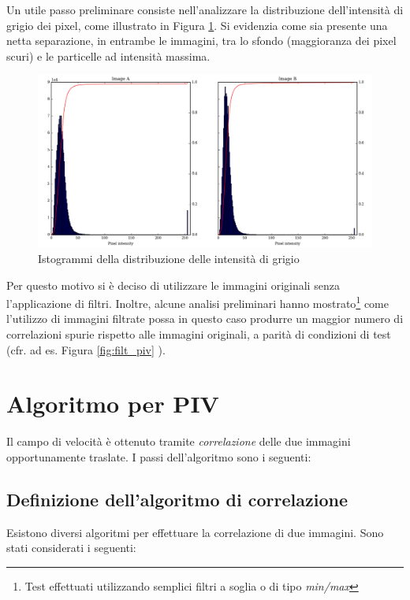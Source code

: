\documentclass[a4paper]{article}
\begin{document}
Un utile passo preliminare consiste nell'analizzare la distribuzione dell'intensità di grigio dei pixel, come illustrato in Figura \ref{fig:hist}. Si evidenzia come sia presente una netta separazione, in entrambe le immagini, tra lo sfondo (maggioranza dei pixel scuri) e le particelle ad intensità massima.

\begin{figure}[h]
	\centering
	\includegraphics[width=1\textwidth]{images/hist_cr.png}
	\caption{\label{fig:hist}Istogrammi della distribuzione delle intensità di grigio}
\end{figure}

Per questo motivo si è deciso di utilizzare le immagini originali senza l'applicazione di filtri. Inoltre, alcune analisi preliminari hanno mostrato\footnote{Test effettuati utilizzando semplici filtri a soglia o di tipo \textit{min/max}\cite{mmaxf}} come l'utilizzo di immagini filtrate possa in questo caso produrre un maggior numero di correlazioni spurie rispetto alle immagini originali, a parità di condizioni di test (cfr. ad es. Figura \ref{fig:filt_piv} ).


\section{Algoritmo per PIV}
\label{sec:corr}

Il campo di velocità è ottenuto tramite \textit{correlazione} delle due immagini opportunamente traslate. I passi dell'algoritmo sono i seguenti:


\subsection{Definizione dell'algoritmo di correlazione}
Esistono diversi algoritmi \cite{corrCV} per effettuare la correlazione di due immagini. Sono stati considerati i seguenti:
\end{document}
